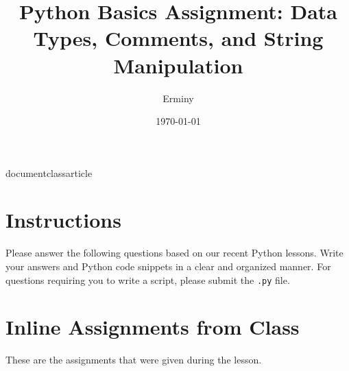 
documentclass{article}
\usepackage{geometry}
\usepackage{amsmath}
\usepackage{array}
\usepackage{hyperref}

\geometry{a4paper, margin=1in}
\renewcommand{\familydefault}{\sfdefault}

\title{\textbf{Python Basics Assignment: Data Types, Comments, and String Manipulation}}
\author{Erminy}
\date{\today}



\maketitle

\section*{Instructions}
Please answer the following questions based on our recent Python lessons. Write your answers and Python code snippets in a clear and organized manner. For questions requiring you to write a script, please submit the \texttt{.py} file.

\hrulefill
\vspace{1em}

\section{Inline Assignments from Class}

These are the assignments that were given during the lesson.

